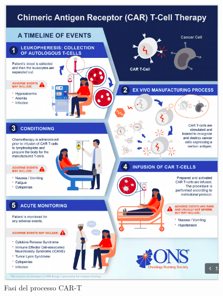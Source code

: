 \begin{figure}[H]
    \begin{center}
    \vspace{-3mm}
    \includegraphics[width=0.9\columnwidth]{img/CAR-T-PROCESS.png}
    \end{center}
    \caption{Fasi del processo CAR-T
    \cite{ONSCART}}

\end{figure}

